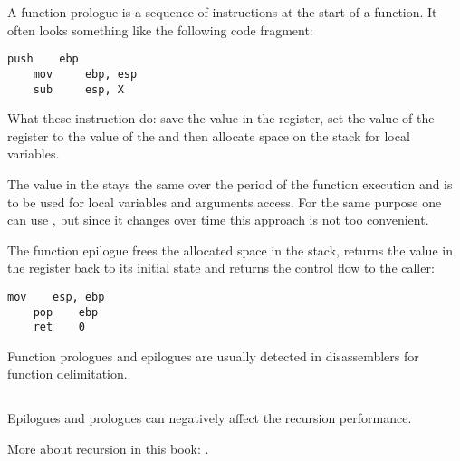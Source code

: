 \label{sec:prologepilog}

A function prologue is a sequence of instructions at the start of a function. It often looks something like the following code fragment:

\begin{lstlisting}[style=customasmx86]
    push    ebp
    mov     ebp, esp
    sub     esp, X
\end{lstlisting}

What these instruction do: save the value in the \EBP register,
set the value of the \EBP register to the value of the \ESP and then allocate space on the stack 
for local variables.

The value in the \EBP stays the same over the period of the function execution and is to be used for local variables and 
arguments access. 
For the same purpose one can use \ESP, but since it changes over time this approach is not too convenient.

The function epilogue frees the allocated space in the stack, returns the value in the \EBP register back to its initial state 
and returns the control flow to the \gls{caller}:

\begin{lstlisting}[style=customasmx86]
    mov    esp, ebp
    pop    ebp
    ret    0
\end{lstlisting}

Function prologues and epilogues are usually detected in disassemblers for function delimitation.

\subsection{\Recursion}

\myindex{\Recursion}
Epilogues and prologues can negatively affect the recursion performance.

More about recursion in this book: .

